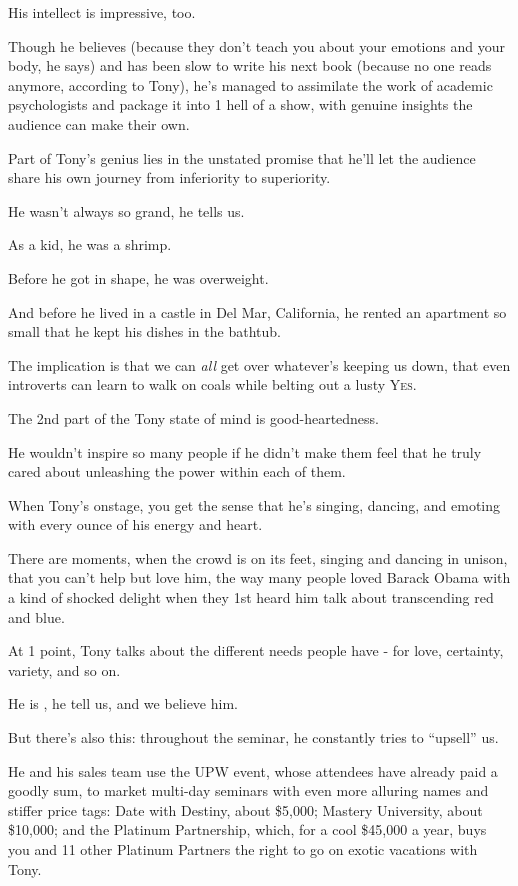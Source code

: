 \documentclass[oneside]{article}
\numberwithin{equation}{section}
\begin{document}
%
His intellect is impressive, too.

Though he believes  (because they don't teach you about your emotions and your body, he says) and has been slow to write his next book (because no one reads anymore, according to Tony), he's managed to assimilate the work of academic psychologists and package it into 1 hell of a show, with genuine insights the audience can make their own.

%
Part of Tony's genius lies in the unstated promise that he'll let the audience share his own journey from inferiority to superiority.

He wasn't always so grand, he tells us.

As a kid, he was a shrimp.

Before he got in shape, he was overweight.

And before he lived in a castle in Del Mar, California, he rented an apartment so small that he kept his dishes in the bathtub.

The implication is that we can \textit{all} get over whatever's keeping us down, that even introverts can learn to walk on coals while belting out a lusty \textsc{Yes}.

%
The 2nd part of the Tony state of mind is good-heartedness.

He wouldn't inspire so many people if he didn't make them feel that he truly cared about unleashing the power within each of them.

When Tony's onstage, you get the sense that he's singing, dancing, and emoting with every ounce of his energy and heart.

There are moments, when the crowd is on its feet, singing and dancing in unison, that you can't help but love him, the way many people loved Barack Obama with a kind of shocked delight when they 1st heard him talk about transcending red and blue.

At 1 point, Tony talks about the different needs people have - for love, certainty, variety, and so on.

He is , he tell us, and we believe him.

%
But there's also this: throughout the seminar, he constantly tries to ``upsell'' us.

He and his sales team use the UPW event, whose attendees have already paid a goodly sum, to market multi-day seminars with even more alluring names and stiffer price tags: Date with Destiny, about \$5,000; Mastery University, about \$10,000; and the Platinum Partnership, which, for a cool \$45,000 a year, buys you and 11 other Platinum Partners the right to go on exotic vacations with Tony.
\end{document}
